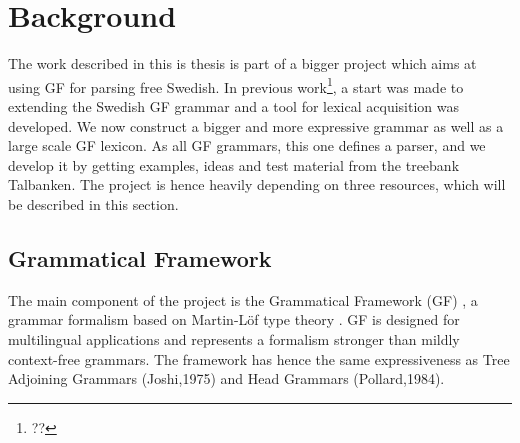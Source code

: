 \documentclass{report}
\begin{document}





\chapter{Background}  
\label{sec:background}
The work described in this is thesis is part of a bigger project which aims at
using GF for parsing free Swedish. 
In previous work\footnote{??}, a start was made to extending the Swedish GF grammar
and a tool for lexical acquisition was developed.
We now construct a bigger
and more expressive grammar as well as a large scale GF lexicon.
As all GF grammars, this one defines a parser, and we develop it by getting
examples, ideas and test material from the treebank Talbanken.
The project is hence heavily depending on three resources, which will be described
in this section.

\section{Grammatical Framework}
\label{sec:gf}
The main component of the project is the Grammatical Framework (GF) \cite{gfbok}, %
a grammar formalism based on Martin-Löf type theory \cite{martinlof}. GF is
designed for multilingual applications and represents a formalism
stronger than mildly context-free grammars. The framework has  hence the same expressiveness
as Tree Adjoining Grammars (Joshi,1975) and Head Grammars (Pollard,1984).
\end{document}
